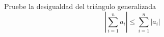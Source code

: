 \item Pruebe la desigualdad del triángulo generalizada
$$\left| \sum_{i=1}^n a_i \right| \le \sum_{i=1}^n |a_i|$$
